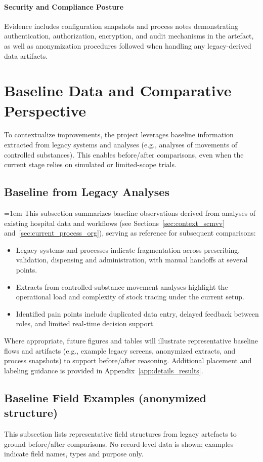 \paragraph{Security and Compliance Posture}
Evidence includes configuration snapshots and process notes demonstrating authentication, authorization, encryption, and audit mechanisms in the artefact, as well as anonymization procedures followed when handling any legacy-derived data artifacts.

\section{Baseline Data and Comparative Perspective}
To contextualize improvements, the project leverages baseline information extracted from legacy systems and analyses (e.g., analyses of movements of controlled substances). This enables before/after comparisons, even when the current stage relies on simulated or limited-scope trials.

\subsection{Baseline from Legacy Analyses}
\begingroup\emergencystretch=1em
This subsection summarizes baseline observations derived from analyses of existing hospital data and workflows (see Sections~\ref{sec:context_scmvv} and~\ref{sec:current_process_org}), serving as reference for subsequent comparisons:
\begin{itemize}
    \item Legacy systems and processes indicate fragmentation across prescribing, validation, dispensing and administration, with manual handoffs at several points.
    \item Extracts from controlled-substance movement analyses highlight the operational load and complexity of stock tracing under the current setup.
    \item Identified pain points include duplicated data entry, delayed feedback between roles, and limited real-time decision support.
\end{itemize}
Where appropriate, future figures and tables will illustrate representative baseline flows and artifacts (e.g., example legacy screens, anonymized extracts, and process snapshots) to support before/after reasoning.
Additional placement and labeling guidance is provided in Appendix~\ref{app:details_results}.
\endgroup

\subsection{Baseline Field Examples (anonymized structure)}
This subsection lists representative field structures from legacy artefacts to ground before/after comparisons. No record-level data is shown; examples indicate field names, types and purpose only.


